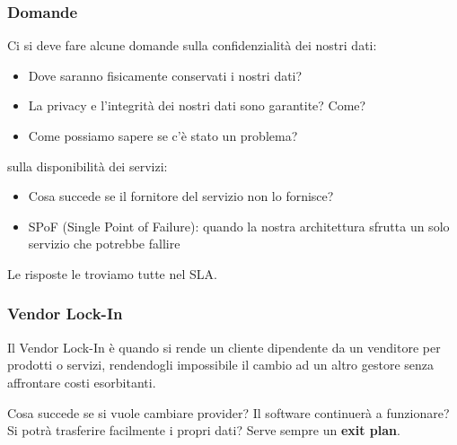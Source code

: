 \subsubsection{Domande}
Ci si deve fare alcune domande sulla confidenzialità dei nostri dati:
\begin{itemize}
	\item Dove saranno fisicamente conservati i nostri dati?
	\item La privacy e l'integrità dei nostri dati sono garantite? Come?
	\item Come possiamo sapere se c'è stato un problema?
\end{itemize}
sulla disponibilità dei servizi: 
\begin{itemize}
	\item Cosa succede se il fornitore del servizio non lo fornisce?
	\item SPoF (Single Point of Failure): quando la nostra architettura sfrutta un solo servizio che potrebbe fallire
\end{itemize}
Le risposte le troviamo tutte nel SLA.

\subsubsection{Vendor Lock-In}
\label{vendor_lockin}
\begin{definition}
	Il Vendor Lock-In è quando si rende un cliente dipendente da un venditore per prodotti o servizi, rendendogli impossibile il cambio ad un altro gestore senza affrontare costi esorbitanti.
\end{definition}
Cosa succede se si vuole cambiare provider? Il software continuerà a funzionare? Si potrà trasferire facilmente i propri dati? Serve sempre un \textbf{exit plan}.